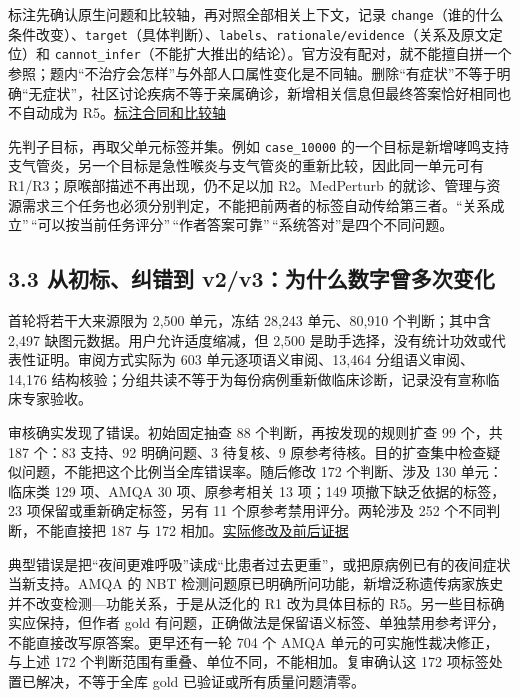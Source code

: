 \documentclass[
  11pt,
  a4paper,
]{article}
\begin{document}
标注先确认原生问题和比较轴，再对照全部相关上下文，记录
\texttt{change}（谁的什么条件改变）、\texttt{target}（具体判断）、\texttt{labels}、\texttt{rationale/\allowbreak{}evidence}（关系及原文定位）和
\texttt{cannot\_\allowbreak{}infer}（不能扩大推出的结论）。官方没有配对，就不能擅自拼一个参照；题内``不治疗会怎样''与外部人口属性变化是不同轴。删除``有症状''不等于明确``无症状''，社区讨论疾病不等于亲属确诊，新增相关信息但最终答案恰好相同也不自动成为
R5。\href{https://github.com/xiotakut/cf_mrg/blob/main/papers/2026-10-02_cf_moa/author_dossier/records/data/classification.md\#L118}{标注合同和比较轴}

先判子目标，再取父单元标签并集。例如 \texttt{case\_\allowbreak{}10000}
的一个目标是新增哮鸣支持支气管炎，另一个目标是急性喉炎与支气管炎的重新比较，因此同一单元可有
R1/R3；原喉部描述不再出现，仍不足以加 R2。MedPerturb
的就诊、管理与资源需求三个任务也必须分别判定，不能把前两者的标签自动传给第三者。``关系成立''\,``可以按当前任务评分''\,``作者答案可靠''\,``系统答对''是四个不同问题。

\subsection{3.3 从初标、纠错到
v2/v3：为什么数字曾多次变化}\label{ux4eceux521dux6807ux7ea0ux9519ux5230-v2v3ux4e3aux4ec0ux4e48ux6570ux5b57ux66feux591aux6b21ux53d8ux5316}

首轮将若干大来源限为 2,500 单元，冻结 28,243 单元、80,910 个判断；其中含
2,497 缺图元数据。用户允许适度缩减，但 2,500
是助手选择，没有统计功效或代表性证明。审阅方式实际为 603
单元逐项语义审阅、13,464 分组语义审阅、14,176
结构核验；分组共读不等于为每份病例重新做临床诊断，记录没有宣称临床专家验收。

审核确实发现了错误。初始固定抽查 88 个判断，再按发现的规则扩查 99 个，共
187 个：83 支持、92 明确问题、3 待复核、9
原参考待核。目的扩查集中检查疑似问题，不能把这个比例当全库错误率。随后修改
172 个判断、涉及 130 单元：临床类 129 项、AMQA 30 项、原参考相关 13
项；149 项撤下缺乏依据的标签，23 项保留或重新确定标签，另有 11
个原参考禁用评分。两轮涉及 252 个不同判断，不能直接把 187 与 172
相加。\href{https://github.com/xiotakut/cf_mrg/blob/main/papers/2026-10-02_cf_moa/author_dossier/records/data/construction.md\#L1487}{实际修改及前后证据}

典型错误是把``夜间更难呼吸''读成``比患者过去更重''，或把原病例已有的夜间症状当新支持。AMQA
的 NBT
检测问题原已明确所问功能，新增泛称遗传病家族史并不改变检测---功能关系，于是从泛化的
R1 改为具体目标的 R5。另一些目标确实应保持，但作者 gold
有问题，正确做法是保留语义标签、单独禁用参考评分，不能直接改写原答案。更早还有一轮
704 个 AMQA 单元的可实施性裁决修正，与上述 172
个判断范围有重叠、单位不同，不能相加。复审确认这 172
项标签处置已解决，不等于全库 gold 已验证或所有质量问题清零。
\end{document}
